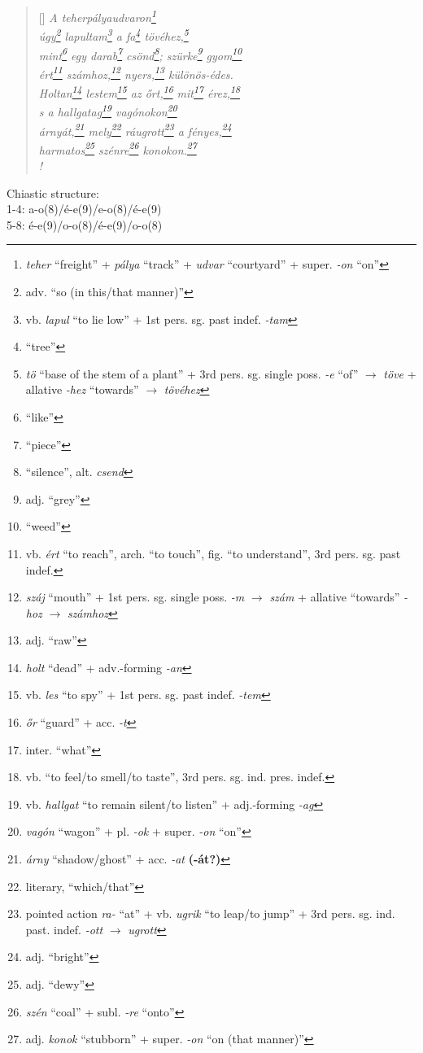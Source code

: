 \documentclass[a4paper,12pt,twoside,final]{book}
\begin{document}
\begin{verse}[\versewidth]
  \it
  A teherpályaudvaron\footnote{\emph{teher} ``freight'' + \emph{pálya}
  ``track'' + \emph{udvar} ``courtyard'' + super. \emph{-on} ``on''} \\
  úgy\footnote{adv. ``so (in this/that manner)''}
  lapultam\footnote{vb. \emph{lapul} ``to lie low''
  + 1st pers. sg. past indef. \emph{-tam}} a
  fa\footnote{``tree''} tövéhez,\footnote{\emph{tö} ``base of the stem
  of a plant'' + 3rd pers. sg. single poss. \emph{-e} ``of''
  $\rightarrow$ \emph{töve} + allative \emph{-hez} ``towards''
  $\rightarrow$ \emph{tövéhez}} \\
  mint\footnote{``like''} egy darab\footnote{``piece''}
  csönd\footnote{``silence'', alt. \emph{csend}};
  szürke\footnote{adj. ``grey''} gyom\footnote{``weed''} \\
  ért\footnote{vb. \emph{ért} ``to reach'', arch. ``to touch'',
  fig. ``to understand'', 3rd pers. sg. past indef.}
  számhoz,\footnote{\emph{száj} ``mouth'' + 1st
  pers. sg. single poss. \emph{-m} $\rightarrow$ \emph{szám} +
  allative ``towards'' \emph{-hoz} $\rightarrow$ \emph{számhoz}}
  nyers,\footnote{adj. ``raw''} különös-édes. \\
  Holtan\footnote{\emph{holt} ``dead'' + adv.-forming \emph{-an}}
  lestem\footnote{vb. \emph{les} ``to spy'' + 1st
  pers. sg. past indef. \emph{-tem}} az őrt,\footnote{\emph{őr} ``guard'' +
  acc. \emph{-t}} mit\footnote{inter. ``what''}
  érez,\footnote{vb. ``to feel/to smell/to taste'',
  3rd pers. sg. ind. pres. indef.} \\
  s a hallgatag\footnote{vb. \emph{hallgat} ``to remain silent/to
  listen'' + adj.-forming \emph{-ag}} vagónokon\footnote{\emph{vagón}
  ``wagon'' + pl. \emph{-ok} + super. \emph{-on} ``on''} \\
  árnyát,\footnote{\emph{árny} ``shadow/ghost'' +
  acc. \emph{-at} \textbf{(-át?)}} mely\footnote{literary,
  ``which/that''} ráugrott\footnote{pointed action \emph{ra-} ``at'' +
  vb. \emph{ugrik} ``to leap/to jump'' + 3rd
  pers. sg. ind. past. indef. \emph{-ott} $\rightarrow$ \emph{ugrott}} a
  fényes,\footnote{adj. ``bright''} \\
  harmatos\footnote{adj. ``dewy''} szénre\footnote{\emph{szén}
  ``coal'' + subl. \emph{-re} ``onto''}
  konokon.\footnote{adj. \emph{konok} ``stubborn'' +
  super. \emph{-on} ``on (that manner)''} \\!
\end{verse}

\noindent Chiastic structure: \\
1-4: a-o(8)/é-e(9)/e-o(8)/é-e(9) \\
5-8: é-e(9)/o-o(8)/é-e(9)/o-o(8)
\end{document}
